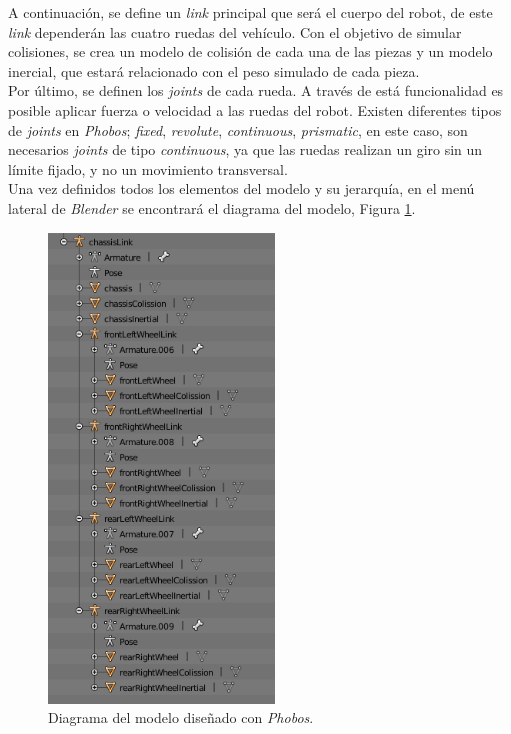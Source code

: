 A continuación, se define un \textit{link} principal que será el cuerpo del robot, de este \textit{link} dependerán las cuatro ruedas del vehículo. Con el objetivo de simular colisiones, se crea un modelo de colisión de cada una de las piezas y un modelo inercial, que estará relacionado con el peso simulado de cada pieza.\\

Por último, se definen los \textit{joints} de cada rueda. A través de está funcionalidad es posible aplicar fuerza o velocidad a las ruedas del robot. Existen diferentes tipos de
\textit{joints} en \textit{Phobos}; \textit{fixed}, \textit{revolute}, \textit{continuous}, \textit{prismatic}, en este caso, son necesarios \textit{joints} de tipo \textit{continuous}, ya que las ruedas realizan un giro sin un límite fijado, y no un movimiento transversal.\\

Una vez definidos todos los elementos del modelo y su jerarquía, en el menú lateral de \textit{Blender} se encontrará el diagrama del modelo, Figura \ref{fig:blenderdiagram}.\\

\begin{figure} [h!]
	\begin{center}
		\includegraphics[width=6cm]{figs/phobosDiagram}
	\end{center}
	\caption{Diagrama del modelo diseñado con \textit{Phobos}.}
	\label{fig:blenderdiagram}
\end{figure}\

